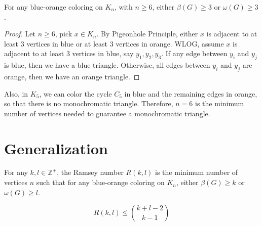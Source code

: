 \begin{theorem}
	For any blue-orange coloring on $K_n$, with $n\ge 6$, either $\beta(G)\ge 3$ or $\omega(G)\ge 3$.
\end{theorem}
\begin{proof}
	Let $n\ge 6$, pick $x\in K_n$.
	By Pigeonhole Principle, either $x$ is adjacent to at least 3 vertices in blue or at least 3 vertices in orange. WLOG, assume $x$ is adjacent to at least 3 vertices in blue, say $y_1,y_2,y_3$. If any edge between $y_i$ and $y_j$ is blue, then we have a blue triangle. Otherwise, all edges between $y_i$ and $y_j$ are orange, then we have an orange triangle.
\end{proof}

Also, in $K_5$, we can color the cycle $C_5$ in blue and the remaining edges in orange, so that there is no monochromatic triangle. Therefore, $n=6$ is the minimum number of vertices needed to guarantee a monochromatic triangle.

\section{Generalization}

\begin{definition}
	For any $k,l\in \mathbb{Z}^+$, the Ramsey number $R(k,l)$ is the minimum number of vertices $n$ such that for any blue-orange coloring on $K_n$, either $\beta(G)\ge k$ or $\omega(G)\ge l$.
\end{definition}
\begin{theorem}
	\[ R(k,l) \le \binom{k+l-2}{k-1} \]
\end{theorem}
